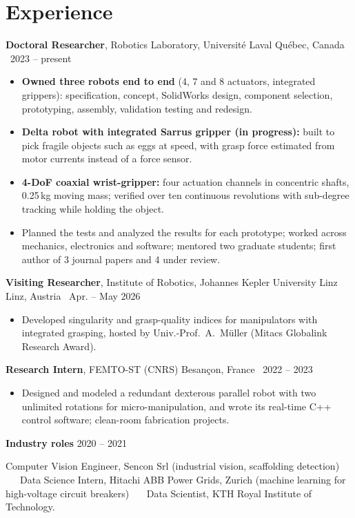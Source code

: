 \documentclass[10pt,letterpaper]{article}
\newcommand{\role}[4]{\textbf{#1}, #2 \hfill {\color{muted}#3 \textbar\ #4}\par}
\begin{document}
\section{Experience}
\role{Doctoral Researcher}{Robotics Laboratory, Universit\'e Laval}{Qu\'ebec, Canada}{2023 -- present}
\begin{itemize}
\item \textbf{Owned three robots end to end} (4, 7 and 8 actuators, integrated grippers): specification, concept,
SolidWorks design, component selection, prototyping, assembly, validation testing and redesign.
\item \textbf{Delta robot with integrated Sarrus gripper (in progress):} built to pick fragile objects such as eggs at
speed, with grasp force estimated from motor currents instead of a force sensor.
\item \textbf{4-DoF coaxial wrist-gripper:} four actuation channels in concentric shafts, 0.25\,kg moving mass; verified
over ten continuous revolutions with sub-degree tracking while holding the object.
\item Planned the tests and analyzed the results for each prototype; worked across mechanics, electronics and software;
mentored two graduate students; first author of 3 journal papers and 4 under review.
\end{itemize}

\vspace{3pt}
\role{Visiting Researcher}{Institute of Robotics, Johannes Kepler University Linz}{Linz, Austria}{Apr. -- May 2026}
\begin{itemize}
\item Developed singularity and grasp-quality indices for manipulators with integrated grasping, hosted by Univ.-Prof.~A.~M\"uller (Mitacs Globalink Research Award).
\end{itemize}

\vspace{3pt}
\role{Research Intern}{FEMTO-ST (CNRS)}{Besan\c{c}on, France}{2022 -- 2023}
\begin{itemize}
\item Designed and modeled a redundant dexterous parallel robot with two unlimited rotations for micro-manipulation, and wrote its real-time C++ control software; clean-room fabrication projects.
\end{itemize}

\vspace{3pt}
\textbf{Industry roles} \hfill {\color{muted}2020 -- 2021}\par
{\small Computer Vision Engineer, Sencon Srl (industrial vision, scaffolding detection) \ \textbullet\ \ Data Science
Intern, Hitachi ABB Power Grids, Zurich (machine learning for high-voltage circuit breakers) \ \textbullet\ \ Data
Scientist, KTH Royal Institute of Technology.}
\end{document}
